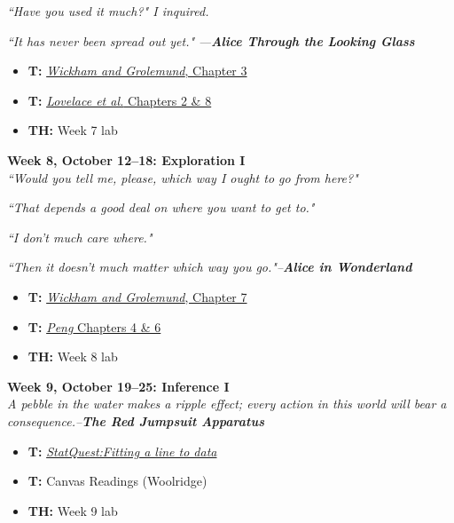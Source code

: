 \documentclass[11pt]{article}
\begin{document}
\textit{``Have you used it much?" I inquired.}

\textit{``It has never been spread out yet."}
\textit{---\textbf{Alice Through the Looking Glass}}

\begin{itemize}
\item \textbf{T:} \href{https://r4ds.had.co.nz/data-visualisation.html}{\textit{Wickham and Grolemund}, Chapter 3} 
\item \textbf{T:} \href{https://geocompr.robinlovelace.net/}{\textit{Lovelace et al.} Chapters 2 \& 8} 
\item \textbf{TH:} Week 7 lab
\end{itemize}
\vspace{1em}

\textbf{Week 8, October 12--18: Exploration I}
\\
\textit{``Would you tell me, please, which way I ought to go from here?"}

\textit{``That depends a good deal on where you want to get to."}

\textit{``I don't much care where."}

\textit{``Then it doesn't much matter which way you go."--\textbf{Alice in Wonderland}}
\begin{itemize}
\item \textbf{T:} \href{https://r4ds.had.co.nz/exploratory-data-analysis.html}{\textit{Wickham and Grolemund}, Chapter 7} 
\item \textbf{T:} \href{https://bookdown.org/rdpeng/exdata/}{\textit{Peng} Chapters 4 \& 6} 
\item \textbf{TH:} Week 8 lab
\end{itemize}
\vspace{1em}
\textbf{Week 9, October 19--25: Inference I}
\\
\textit{A pebble in the water makes a ripple effect; every action in this world will bear a consequence.--\textbf{The Red Jumpsuit Apparatus}}
\begin{itemize}
\item \textbf{T:} \href{https://www.youtube.com/watch?v=PaFPbb66DxQ}{\textit{StatQuest:Fitting a line to data}} 
\item \textbf{T:} Canvas Readings (Woolridge) 
\item \textbf{TH:} Week 9 lab
\end{itemize}
\vspace{1em}
\end{document}
